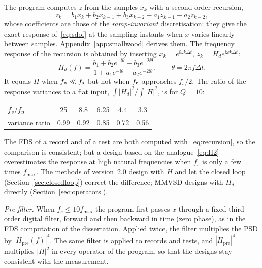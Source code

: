 The program computes $z$ from the samples $x_k$ with a second-order recursion,
\begin{equation}\label{eq:recursion}
  z_k = b_1x_k + b_2x_{k-1} + b_3x_{k-2} - a_1 z_{k-1} - a_2 z_{k-2},
\end{equation}
whose coefficients are those of the \emph{ramp-invariant} discretisation: they give the exact
response of~\eqref{eq:sdof} at the sampling instants when $x$ varies linearly between samples.
Appendix~\ref{app:smallwood} derives them. The frequency response of the recursion is obtained by
inserting $x_k = e^{\ii\omega k\Delta t}$, $z_k = H_d e^{\ii\omega k\Delta t}$:
\begin{equation}\label{eq:Hd}
  H_d(f) = \frac{b_1 + b_2 e^{-\ii\theta} + b_3 e^{-2\ii\theta}}{1 + a_1e^{-\ii\theta}+a_2e^{-2\ii\theta}},
  \qquad \theta = 2\pi f\Delta t .
\end{equation}
It equals $H$ when $f_{\mathrm{n}}\ll f_s$ but not when $f_{\mathrm{n}}$ approaches $f_s/2$. The ratio of the response
variances to a flat input, $\int|H_d|^2/\int|H|^2$, is for $Q=10$:
\begin{center}
\begin{tabular}{lccccc}
\toprule
$f_s/f_{\mathrm{n}}$ & 25 & 8.8 & 6.25 & 4.4 & 3.3 \\
variance ratio & 0.99 & 0.92 & 0.85 & 0.72 & 0.56 \\
\bottomrule
\end{tabular}
\end{center}
The FDS of a record and of a test are both computed with~\eqref{eq:recursion}, so the comparison is
consistent; but a design based on the analogue~\eqref{eq:H2} overestimates the response at high
natural frequencies when $f_s$ is only a few times $f_{\max}$. The methods of version~2.0 design with
$H$ and let the closed loop (Section~\ref{sec:closedloop}) correct the difference; MMVSD designs with
$H_d$ directly (Section~\ref{sec:operators}).

\emph{Pre-filter.} When $f_s\le 10f_{\max}$ the program first passes $x$ through a fixed third-order
digital filter, forward and then backward in time (zero phase), as in the FDS computation of the
dissertation. Applied twice, the filter multiplies the PSD by $|H_{\mathrm{pre}}(f)|^4$. The same
filter is applied to records and tests, and $|H_{\mathrm{pre}}|^4$ multiplies $|H|^2$ in every
operator of the program, so that the designs stay consistent with the measurement.
